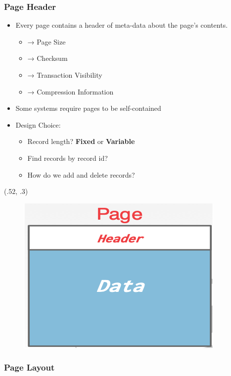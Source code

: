 \begin{frame}[fragile]
	\frametitle{Page Header}
	\begin{itemize}
		\item Every page contains a header of meta-data about the page's contents.
		\begin{itemize}
			\item → Page Size
			\item → Checksum
			\item → Transaction Visibility
			\item → Compression Information
		\end{itemize}
		\item Some systems require pages to be self-contained
		\item Design Choice:
		\begin{itemize}
			\item Record length? \textbf{Fixed} or \textbf{Variable}
			\item Find records by record id?
			\item How do we add and delete records?
		\end{itemize}
	\end{itemize}
	\begin{textblock*}{.45\paperwidth}(.52\paperwidth, .3\paperheight) %
		\begin{figure}
			\includegraphics[width=.4\linewidth]{figs/dbfile-pageheader.png}
		\end{figure}
	\end{textblock*}
\end{frame}


\subsubsection{Page Layout}

